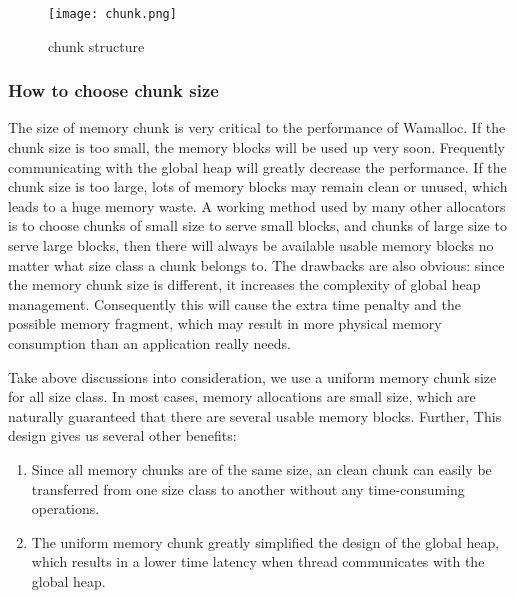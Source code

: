 \documentclass[10pt, conference, compsocconf]{IEEEtran}
\begin{document}
\begin{figure}[h]
\centering
\texttt{[image: chunk.png]}
\caption{chunk structure}
\label{fig:chunk}
\end{figure}

\subsubsection{How to choose chunk size}
The size of memory chunk is very critical to the performance of Wamalloc. 
If the chunk size is too small, 
the memory blocks will be used up very soon.
Frequently communicating with the global heap will greatly decrease the performance.
If the chunk size is too large, lots of memory blocks may remain clean or unused, which leads to a huge memory waste. 
A working method used by many other allocators is to choose chunks of small size to serve small blocks, 
and chunks of large size to serve large blocks,
then there will always be available usable memory blocks no matter what size class a chunk belongs to.
The drawbacks are also obvious:
since the memory chunk size is different, it increases the complexity of global heap management.
Consequently this will cause the extra time penalty and the possible memory fragment, 
which may result in more physical memory consumption than an application really needs.

Take above discussions into consideration, 
we use a uniform memory chunk size for all size class. 
In most cases, memory allocations are small size, 
which are naturally guaranteed that there are several usable memory blocks. 
Further, This design gives us several other benefits: 
\begin{enumerate}
    \item Since all memory chunks are of the same size, an clean chunk can easily be transferred from one size class to another without any time-consuming operations.
    \item The uniform memory chunk greatly simplified the design of the global heap, 
        which results in a lower time latency when thread communicates with the global heap.
\end{enumerate}
\end{document}
